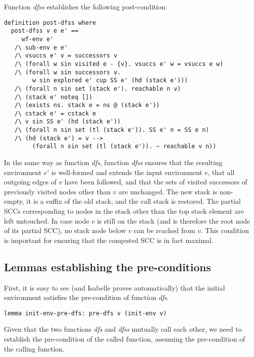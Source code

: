 \documentclass[sigplan,10pt,anonymous,review]{acmart}
\newcommand{\prog}[1]{\textit{#1}}
\begin{document}
Function \prog{dfss} establishes the following post-condition:

\begin{small}
\begin{lstlisting}[language=isabelle]
definition post-dfss where 
  post-dfss v e e' == 
     wf-env e'
   /\ sub-env e e'
   /\ vsuccs e' v = successors v
   /\ (forall w sin visited e - {v}. vsuccs e' w = vsuccs e w)
   /\ (forall w sin successors v.
        w sin explored e' cup SS e' (hd (stack e')))
   /\ (forall n sin set (stack e'). reachable n v)
   /\ (stack e' noteq [])
   /\ (exists ns. stack e = ns @ (stack e'))
   /\ cstack e' = cstack e
   /\ v sin SS e' (hd (stack e'))
   /\ (forall n sin set (tl (stack e')). SS e' n = SS e n)
   /\ (hd (stack e') = v -->
        (forall n sin set (tl (stack e')). ~ reachable v n))
\end{lstlisting}
\end{small}

In the same way as function \prog{dfs}, function \prog{dfss} ensures that the resulting environment $e'$ is well-formed and extends the input environment $e$, that all outgoing edges of $v$ have been followed, and that the sets of visited successors of previously visited nodes other than $v$ are unchanged. The new stack is non-empty, it is a suffix of the old stack, and the call stack is restored. The partial SCCs corresponding to nodes in the stack other than the top stack element are left untouched. In case node $v$ is still on the stack (and is therefore the root node of its partial SCC), no stack node below $v$ can be reached from $v$. This condition is important for ensuring that the computed SCC is in fact maximal.


\subsection{Lemmas establishing the pre-conditions}
\label{sec:pre-implies-pre}

First, it is easy to see (and Isabelle proves automatically) that the initial environment satisfies the pre-condition of function \prog{dfs}.

\begin{small}
\begin{lstlisting}[language=isabelle]
lemma init-env-pre-dfs: pre-dfs v (init-env v)
\end{lstlisting}
\end{small}

Given that the two functions \prog{dfs} and \prog{dfss} mutually call each other, we need to establish the pre-condition of the called function, assuming the pre-condition of the calling function.
\end{document}
